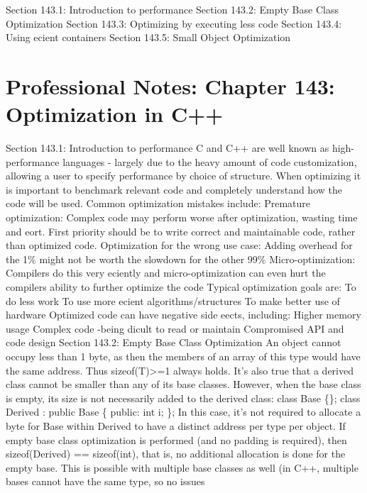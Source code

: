 Section 143.1: Introduction to performance Section 143.2: Empty Base
Class Optimization Section 143.3: Optimizing by executing less code
Section 143.4: Using ecient containers Section 143.5: Small Object
Optimization

\hypertarget{professional-notes-chapter-143-optimization-in-c-1}{%
\section{Professional Notes: Chapter 143: Optimization in
C++}\label{professional-notes-chapter-143-optimization-in-c-1}}

Section 143.1: Introduction to performance C and C++ are well known as
high-performance languages - largely due to the heavy amount of code
customization, allowing a user to specify performance by choice of
structure. When optimizing it is important to benchmark relevant code
and completely understand how the code will be used. Common optimization
mistakes include: Premature optimization: Complex code may perform worse
after optimization, wasting time and eort. First priority should be to
write correct and maintainable code, rather than optimized code.
Optimization for the wrong use case: Adding overhead for the 1\% might
not be worth the slowdown for the other 99\% Micro-optimization:
Compilers do this very eciently and micro-optimization can even hurt the
compilers ability to further optimize the code Typical optimization
goals are: To do less work To use more ecient algorithms/structures To
make better use of hardware Optimized code can have negative side eects,
including: Higher memory usage Complex code -being dicult to read or
maintain Compromised API and code design Section 143.2: Empty Base Class
Optimization An object cannot occupy less than 1 byte, as then the
members of an array of this type would have the same address. Thus
sizeof(T)\textgreater=1 always holds. It's also true that a derived
class cannot be smaller than any of its base classes. However, when the
base class is empty, its size is not necessarily added to the derived
class: class Base \{\}; class Derived : public Base \{ public: int i;
\}; In this case, it's not required to allocate a byte for Base within
Derived to have a distinct address per type per object. If empty base
class optimization is performed (and no padding is required), then
sizeof(Derived) == sizeof(int), that is, no additional allocation is
done for the empty base. This is possible with multiple base classes as
well (in C++, multiple bases cannot have the same type, so no issues
